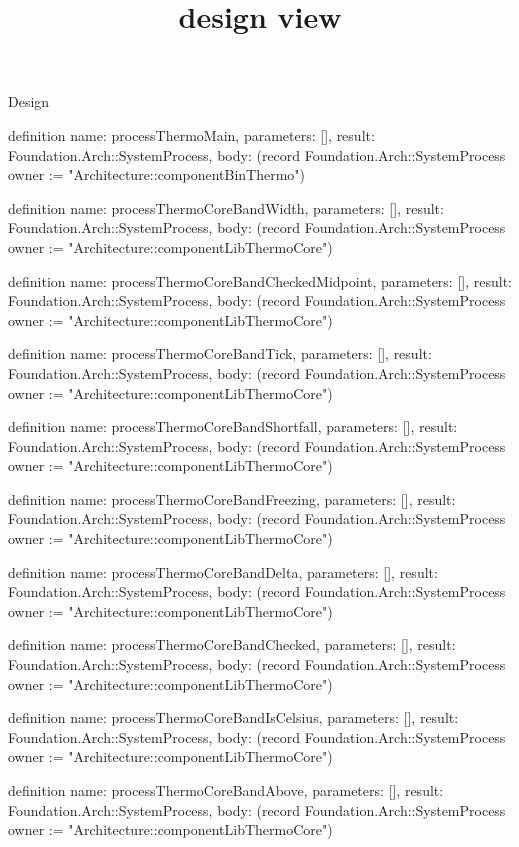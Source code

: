 \begin{lexlean}{Design}
\title{design view}
\begin{semanticmodule}
definition{
  name: processThermoMain,
  parameters: [],
  result: Foundation.Arch::SystemProcess,
  body: (record Foundation.Arch::SystemProcess {owner := "Architecture::componentBinThermo"})
}

definition{
  name: processThermoCoreBandWidth,
  parameters: [],
  result: Foundation.Arch::SystemProcess,
  body: (record Foundation.Arch::SystemProcess {owner := "Architecture::componentLibThermoCore"})
}

definition{
  name: processThermoCoreBandCheckedMidpoint,
  parameters: [],
  result: Foundation.Arch::SystemProcess,
  body: (record Foundation.Arch::SystemProcess {owner := "Architecture::componentLibThermoCore"})
}

definition{
  name: processThermoCoreBandTick,
  parameters: [],
  result: Foundation.Arch::SystemProcess,
  body: (record Foundation.Arch::SystemProcess {owner := "Architecture::componentLibThermoCore"})
}

definition{
  name: processThermoCoreBandShortfall,
  parameters: [],
  result: Foundation.Arch::SystemProcess,
  body: (record Foundation.Arch::SystemProcess {owner := "Architecture::componentLibThermoCore"})
}

definition{
  name: processThermoCoreBandFreezing,
  parameters: [],
  result: Foundation.Arch::SystemProcess,
  body: (record Foundation.Arch::SystemProcess {owner := "Architecture::componentLibThermoCore"})
}

definition{
  name: processThermoCoreBandDelta,
  parameters: [],
  result: Foundation.Arch::SystemProcess,
  body: (record Foundation.Arch::SystemProcess {owner := "Architecture::componentLibThermoCore"})
}

definition{
  name: processThermoCoreBandChecked,
  parameters: [],
  result: Foundation.Arch::SystemProcess,
  body: (record Foundation.Arch::SystemProcess {owner := "Architecture::componentLibThermoCore"})
}

definition{
  name: processThermoCoreBandIsCelsius,
  parameters: [],
  result: Foundation.Arch::SystemProcess,
  body: (record Foundation.Arch::SystemProcess {owner := "Architecture::componentLibThermoCore"})
}

definition{
  name: processThermoCoreBandAbove,
  parameters: [],
  result: Foundation.Arch::SystemProcess,
  body: (record Foundation.Arch::SystemProcess {owner := "Architecture::componentLibThermoCore"})
}


\end{semanticmodule}
\end{lexlean}
